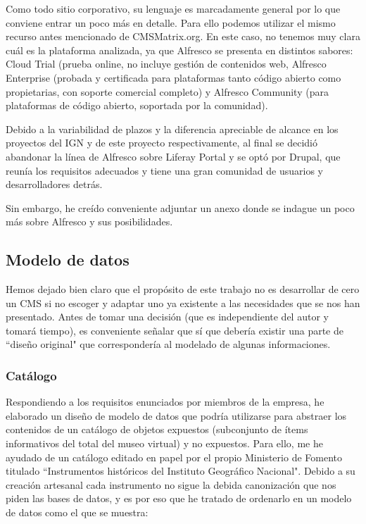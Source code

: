 \par Como todo sitio corporativo, su lenguaje es marcadamente general por lo que conviene entrar un poco más en detalle. Para ello podemos utilizar el mismo recurso antes mencionado de CMSMatrix.org\cite{refrences:alfrescocmsmat}. En este caso, no tenemos muy clara cuál es la plataforma analizada, ya que Alfresco se presenta en distintos sabores\cite{references:alfrescocomp}: Cloud Trial (prueba online, no incluye gestión de contenidos web, Alfresco Enterprise (probada y certificada para plataformas tanto código abierto como propietarias, con soporte comercial completo) y Alfresco Community (para plataformas de código abierto, soportada por la comunidad).

\par Debido a la variabilidad de plazos y la diferencia apreciable de alcance en los proyectos del IGN y de este proyecto respectivamente, al final se decidió abandonar la línea de Alfresco sobre Liferay Portal y se optó por Drupal, que reunía los requisitos adecuados y tiene una gran comunidad de usuarios y desarrolladores detrás.

Sin embargo, he creído conveniente adjuntar un anexo donde se indague un poco más sobre Alfresco y sus posibilidades.

\subsection{Modelo de datos}
\par Hemos dejado bien claro que el propósito de este trabajo no es desarrollar de cero un CMS si no escoger y adaptar uno ya existente a las necesidades que se nos han presentado. Antes de tomar una decisión (que es independiente del autor y tomará tiempo), es conveniente señalar que sí que debería existir una parte de ``diseño original" que correspondería al modelado de algunas informaciones. 


\subsubsection{Catálogo}
\par Respondiendo a los requisitos enunciados por miembros de la empresa, he elaborado un diseño de modelo de datos que podría utilizarse para abstraer los contenidos de un catálogo de objetos expuestos (subconjunto de ítems informativos del total del museo virtual) y no expuestos.
Para ello, me he ayudado de un catálogo editado en papel por el propio Ministerio de Fomento titulado ``Instrumentos históricos del Instituto Geográfico Nacional". Debido a su creación artesanal cada instrumento no sigue la debida canonización que nos piden las bases de datos, y es por eso que he tratado de ordenarlo en un modelo de datos como el que se muestra:

